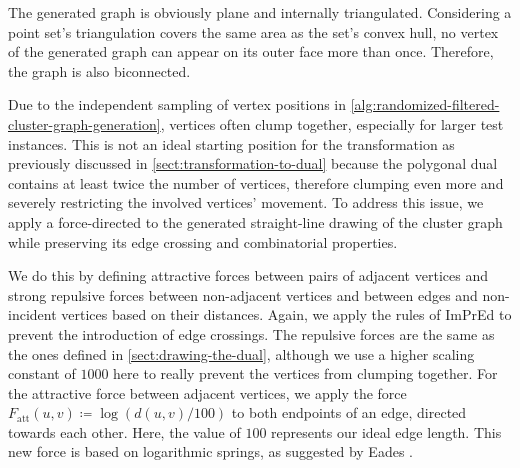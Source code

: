 The generated graph is obviously plane and internally triangulated.
Considering a point set's triangulation covers the same area as the set's convex hull, no vertex of the generated graph can appear on its outer face more than once.
Therefore, the graph is also biconnected.

Due to the independent sampling of vertex positions in \cref{alg:randomized-filtered-cluster-graph-generation}, vertices often clump together, especially for larger test instances.
This is not an ideal starting position for the transformation as previously discussed in \cref{sect:transformation-to-dual} because the polygonal dual contains at least twice the number of vertices, therefore clumping even more and severely restricting the involved vertices' movement.
To address this issue, we apply a force-directed  to the generated straight-line drawing \clusterdrawing{} of the cluster graph while preserving its edge crossing and combinatorial properties.

We do this by defining attractive forces between pairs of adjacent vertices and strong repulsive forces between non-adjacent vertices and between edges and non-incident vertices based on their distances.
Again, we apply the rules of ImPrEd \cite{simonetto2011impred} to prevent the introduction of edge crossings.
The repulsive forces are the same as the ones defined in \cref{sect:drawing-the-dual}, although we use a higher scaling constant of $1000$ here to really prevent the vertices from clumping together.
For the attractive force between adjacent vertices, we apply the force $F_\text{att}(u,v) \coloneqq \log(d(u,v) / 100)$ to both endpoints of an edge, directed towards each other.
Here, the value of $100$ represents our ideal edge length.
This new force is based on logarithmic springs, as suggested by Eades \cite{eades84heuristic}.

\vfill

